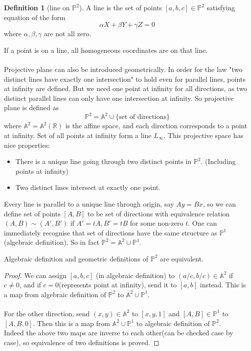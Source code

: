 \documentclass[12pt]{article}
\theoremstyle{remark}
\theoremstyle{definition}
\newtheorem{definition}{Definition}[subsection]
\newcommand{\R}[0]{\mathbb{R}}
\newcommand{\Pc}{\mathbb{P}}   %
\newcommand{\Ac}{\mathbb{A}}   %
\begin{document}
{        \begin{definition}[line on $\Pc^2$]
            A line is the set of points $[a, b, c] \in \Pc^2$ satisfying equation of the form 
            $$\alpha X + \beta Y + \gamma Z = 0$$
            where $\alpha, \beta, \gamma$ are not all zero. 
        \end{definition}
        
        If a point is on a line, all homogeneous coordinates are on that line. \\
        \\
        Projective plane can also be introduced geometrically. In order for the law "two distinct lines       have exactly one intersection" to hold even for parallel lines, points at infinity are defined.        But we need one point at infinity for all directions, as two distinct parallel lines can only         have one intersection at infinity. So projective plane is defined as 
        $$\Pc^2 = \Ac^2 \cup \{\text{set of directions}\}$$
        where $\Ac^2 = \Ac^2(\R)$ is the affine space, and each direction corresponds to a point at         infinity. Set of all points at infinity form a line $L_\infty$. This projective space has nice        properties:
        \begin{itemize}
            \item There is a unique line going through two distinct points in $\Pc^2$. (Including points      at infinity)
            \item Two distinct lines intersect at exactly one point. 
        \end{itemize}
        
        Every line is parallel to a unique line through origin, say $Ay = Bx$, so we can define set of      points $[A, B]$ to be set of directions with equivalence relation $(A, B) \sim (A', B')$ if $A'         = tA, B' = tB$ for some non-zero $t$. One can immediately recognise that set of directions have      the same structure as $\Pc^1$(algebraic definition). So in fact $\Pc^2 = \Ac^2 \cup \Pc^1$. 
        
        \begin{prop}[Equivalence]
            Algebraic definition and geometric definitions of $\Pc^2$ are equivalent. 
        \end{prop}
        \begin{proof}
            We can assign $[a, b, c]$ (in algebraic definition) to $(a/c, b/c) \in \Ac^2$ if $c \neq 0$,         and if $c = 0$(represents point at infinity), send it to $[a, b]$ instead. This is a map        from algebraic definition of $\Pc^2$ to $\Ac^2 \cup \Pc^1$. \\
            \\
            For the other direction, send $(x, y) \in \Ac^2$ to $[x, y, 1]$ and $[A, B] \in \Pc^1$ to      $[A, B, 0]$. Then this is a map from $\Ac^2 \cup \Pc^1$ to algebraic definition of $\Pc^2$.         \\
            Indeed the above two maps are inverse to each other(can be checked case by case), so        equivalence of two definitions is proved. 
        \end{proof}
        
}
\end{document}
